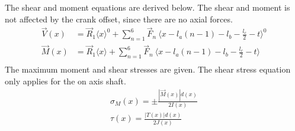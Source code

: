 \documentclass[10pt,a4paper]{article}
\begin{document}
The shear and moment equations are derived below. The shear and moment is not affected by the crank offset, since there are no axial forces.
\begin{align}
	\vec{V}(x) &= \vec{R}_1 \langle x \rangle^0 + \sum_{n=1}^6 \vec{F}_n\ \langle x - l_a (n-1) - l_b - \frac{l_c}{2} - t\rangle^0\\
	\vec{M}(x) &= \vec{R}_1 \langle x \rangle + \sum_{n=1}^6 \vec{F}_n\ \langle x - l_a (n-1) - l_b - \frac{l_c}{2} - t\rangle\\
\end{align}
The maximum moment and shear stresses are given. The shear stress equation only applies for the on axis shaft.
\begin{align}
	\sigma_M (x) = \pm \frac{|\vec{M}(x)| d(x)}{2 I(x)}\\
	\tau (x) = \frac{|T(x)| d (x)}{2 J(x)}
\end{align}
\end{document}
